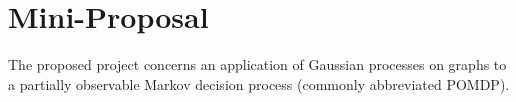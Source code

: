 



\section{Mini-Proposal}\label{sec:mini_prop}


The proposed project concerns an application of Gaussian processes on graphs to a partially observable Markov decision process (commonly abbreviated POMDP).

